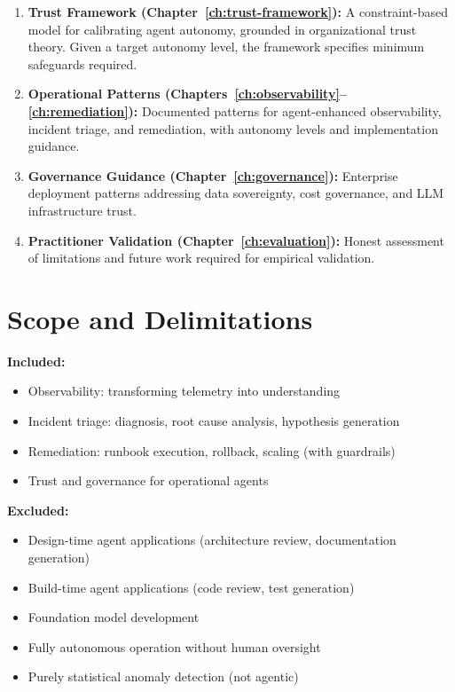 \begin{enumerate}
    \item \textbf{Trust Framework (Chapter~\ref{ch:trust-framework}):} A constraint-based model for calibrating agent autonomy, grounded in organizational trust theory. Given a target autonomy level, the framework specifies minimum safeguards required.

    \item \textbf{Operational Patterns (Chapters~\ref{ch:observability}--\ref{ch:remediation}):} Documented patterns for agent-enhanced observability, incident triage, and remediation, with autonomy levels and implementation guidance.

    \item \textbf{Governance Guidance (Chapter~\ref{ch:governance}):} Enterprise deployment patterns addressing data sovereignty, cost governance, and LLM infrastructure trust.

    \item \textbf{Practitioner Validation (Chapter~\ref{ch:evaluation}):} Honest assessment of limitations and future work required for empirical validation.
\end{enumerate}

\section{Scope and Delimitations}
\label{sec:scope}

\textbf{Included:}
\begin{itemize}
    \item Observability: transforming telemetry into understanding
    \item Incident triage: diagnosis, root cause analysis, hypothesis generation
    \item Remediation: runbook execution, rollback, scaling (with guardrails)
    \item Trust and governance for operational agents
\end{itemize}

\textbf{Excluded:}
\begin{itemize}
    \item Design-time agent applications (architecture review, documentation generation)
    \item Build-time agent applications (code review, test generation)
    \item Foundation model development
    \item Fully autonomous operation without human oversight
    \item Purely statistical anomaly detection (not agentic)
\end{itemize}

